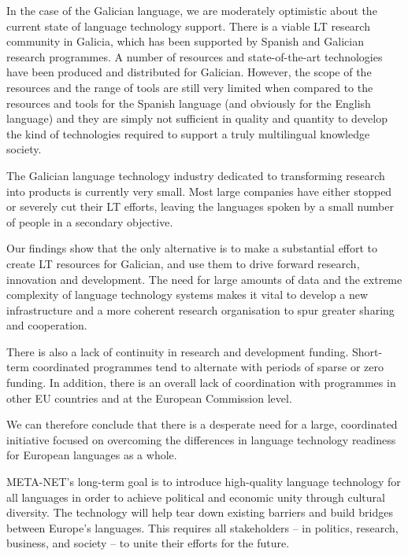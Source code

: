 \begin{multicols}{2}
In the case of the Galician language, we are moderately optimistic about the current state of language technology support. There is a viable LT research community in Galicia, which has been supported by Spanish and Galician research programmes. A number of resources and state-of-the-art technologies have been produced and distributed for Galician. However, the scope of the resources and the range of tools are still very limited when compared to the resources and tools for the Spanish language (and obviously for the English language) and they are simply not sufficient in quality and quantity to develop the kind of technologies required to support a truly multilingual knowledge society.

The Galician language technology industry dedicated to transforming research into products is currently very small. Most large companies have either stopped or severely cut their LT efforts, leaving the languages spoken by a small number of people in a secondary objective.

Our findings show that the only alternative is to make a substantial effort to create LT resources for Galician, and use them to drive forward research, innovation and development. The need for large amounts of data and the extreme complexity of language technology systems makes it vital to develop a new infrastructure and a more coherent research organisation to spur greater sharing and cooperation.

There is also a lack of continuity in research and development funding. Short-term coordinated programmes tend to alternate with periods of sparse or zero funding. In addition, there is an overall lack of coordination with programmes in other EU countries and at the European Commission level.

We can therefore conclude that there is a desperate need for a large, coordinated initiative focused on overcoming the differences in language technology readiness for European languages as a whole.

META-NET’s long-term goal is to introduce high-quality language technology for all languages in order to achieve political and economic unity through cultural diversity. The technology will help tear down existing barriers and build bridges between Europe’s languages. This requires all stakeholders -- in politics, research, business, and society -- to unite their efforts for the future.

\end{multicols}

\clearpage

